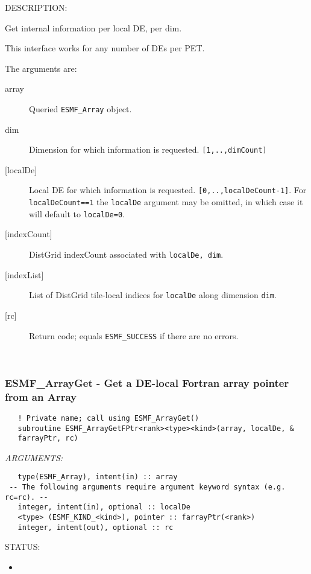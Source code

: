 {\sf DESCRIPTION:\\ }


   Get internal information per local DE, per dim.
  
   This interface works for any number of DEs per PET.
  
   The arguments are:
   \begin{description}
   \item[array]
   Queried {\tt ESMF\_Array} object.
   \item[dim]
   Dimension for which information is requested. {\tt [1,..,dimCount]}
   \item[{[localDe]}]
   Local DE for which information is requested. {\tt [0,..,localDeCount-1]}.
   For {\tt localDeCount==1} the {\tt localDe} argument may be omitted,
   in which case it will default to {\tt localDe=0}.
   \item[{[indexCount]}]
   DistGrid indexCount associated with {\tt localDe, dim}.
   \item[{[indexList]}]
   List of DistGrid tile-local indices for {\tt localDe} along dimension
   {\tt dim}.
   \item[{[rc]}]
   Return code; equals {\tt ESMF\_SUCCESS} if there are no errors.
   \end{description}
   
 
\mbox{}\hrulefill\ 
 
\subsubsection [ESMF\_ArrayGet] {ESMF\_ArrayGet - Get a DE-local Fortran array pointer from an Array }


 
\begin{verbatim}   ! Private name; call using ESMF_ArrayGet() 
   subroutine ESMF_ArrayGetFPtr<rank><type><kind>(array, localDe, & 
   farrayPtr, rc) 
   \end{verbatim}{\em ARGUMENTS:}
\begin{verbatim}   type(ESMF_Array), intent(in) :: array 
 -- The following arguments require argument keyword syntax (e.g. rc=rc). --
   integer, intent(in), optional :: localDe 
   <type> (ESMF_KIND_<kind>), pointer :: farrayPtr(<rank>) 
   integer, intent(out), optional :: rc 
   \end{verbatim}
{\sf STATUS:}
   \begin{itemize} 
   \item{} 
   \end{itemize} 
   
